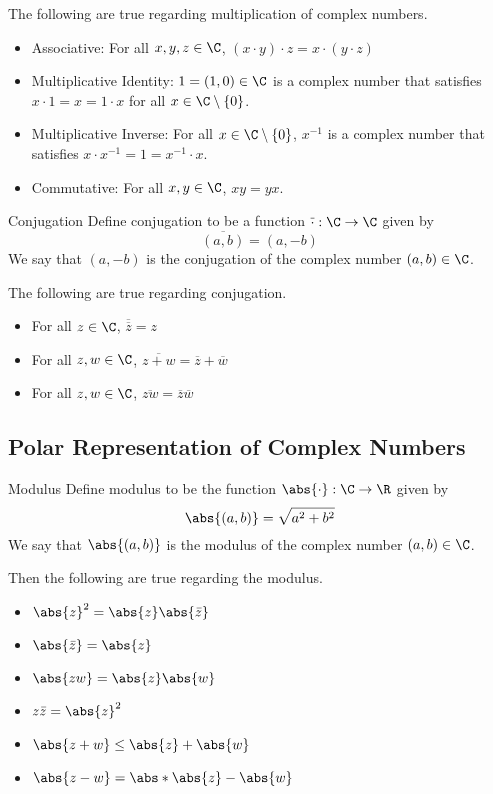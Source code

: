 \documentclass[a4paper]{article}
\begin{document}
\begin{prp}{}{} The following are true regarding multiplication of complex numbers. 
\begin{itemize}
\item Associative: For all $x,y,z\in\C$, $(x\cdot y)\cdot z=x\cdot(y\cdot z)$
\item Multiplicative Identity: $1=(1,0)\in\C$ is a complex number that satisfies $x\cdot 1=x=1\cdot x$ for all $x\in\C\setminus\{0\}$. 
\item Multiplicative Inverse: For all $x\in\C\setminus\{0\}$, $x^{-1}$ is a complex number that satisfies $x\cdot x^{-1}=1=x^{-1}\cdot x$. 
\item Commutative: For all $x,y\in\C$, $xy=yx$. 
\end{itemize}
\end{prp}

\begin{defn}{Conjugation}{} Define conjugation to be a function $\overline{\cdot}:\C\to\C$ given by $$\overline{(a,b)}=(a,-b)$$ We say that $(a,-b)$ is the conjugation of the complex number $(a,b)\in\C$. 
\end{defn}

\begin{prp}{}{} The following are true regarding conjugation. 
\begin{itemize}
\item For all $z\in\C$, $\overline{\overline{z}}=z$
\item For all $z,w\in\C$, $\overline{z+w}=\overline{z}+\overline{w}$
\item For all $z,w\in\C$, $\overline{zw}=\overline{z}\overline{w}$
\end{itemize}
\end{prp}

\subsection{Polar Representation of Complex Numbers}
\begin{defn}{Modulus}{} Define modulus to be the function $\abs{\cdot}:\C\to\R$ given by $$\abs{(a,b)}=\sqrt{a^2+b^2}$$ We say that $\abs{(a,b)}$ is the modulus of the complex number $(a,b)\in\C$. 
\end{defn}

\begin{prp}{}{} Then the following are true regarding the modulus. 
\begin{itemize}
\item $\abs{z}^2=\abs{z}\abs{\bar{z}}$
\item $\abs{\bar{z}}=\abs{z}$
\item $\abs{zw}=\abs{z}\abs{w}$
\item $z\bar{z}=\abs{z}^2$
\item $\abs{z+w}\leq\abs{z}+\abs{w}$
\item $\abs{z-w}=\abs*{\abs{z}-\abs{w}}$
\end{itemize}
\end{prp}
\end{document}
